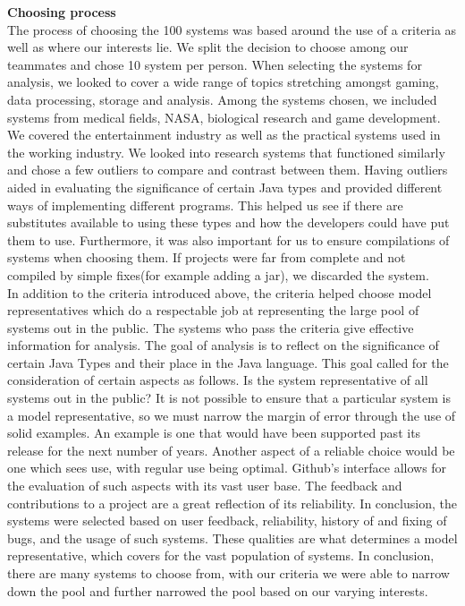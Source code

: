 \documentclass{assignment}
\begin{document}
\textbf{Choosing process}\\

	The process of choosing the 100 systems was based around the use of a criteria as well as where our interests lie. We split the decision to choose among our teammates and chose 10 system per person. When selecting the systems for analysis, we looked to cover a wide range of topics stretching amongst gaming, data processing, storage and analysis. Among the systems chosen, we included systems from medical fields, NASA, biological research and game development. We covered the entertainment industry as well as the practical systems used in the working industry. We looked into research systems that functioned similarly and chose a few outliers to compare and contrast between them. Having outliers aided in evaluating the significance of certain Java types and provided different ways of implementing different programs. This helped us see if there are substitutes available to using these types and how the developers could have put them to use. Furthermore, it was also important for us to ensure compilations of systems when choosing them. If projects were far from complete and not compiled by simple fixes(for example adding a jar), we discarded the system.\\

	In addition to the criteria introduced above, the criteria helped choose model representatives which do a respectable job at representing the large pool of systems out in the public. The systems who pass the criteria give effective information for analysis. The goal of analysis is to reflect on the significance of certain Java Types and their place in the Java language. This goal called for the consideration of certain aspects as follows.  Is the system representative of all systems out in the public? It is not possible to ensure that a particular system is a model representative, so we must narrow the margin of error through the use of solid examples. An example is one that would have been supported past its release for the next number of years. Another aspect of a reliable choice would be one which sees use, with regular use being optimal. Github’s interface allows for the evaluation of such aspects with its vast user base. The feedback and contributions to a project are a great reflection of its reliability. In conclusion, the systems were selected based on user feedback, reliability, history of and fixing of bugs, and the usage of such systems. These qualities are what determines a model representative, which covers for the vast population of systems. In conclusion, there are many systems to choose from, with our criteria we were able to narrow down the pool and further narrowed the pool based on our varying interests.\\
\end{document}
